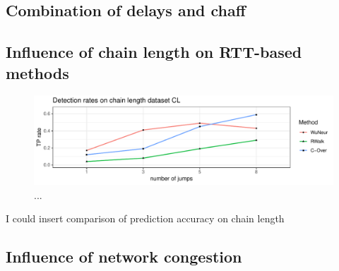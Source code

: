 \documentclass[conference]{IEEEtran}\usepackage[]{graphicx}\usepackage[]{color}
\makeatletter
\def\maxwidth{ %
  \ifdim\Gin@nat@width>\linewidth
    \linewidth
  \else
    \Gin@nat@width
  \fi
}
\newenvironment{knitrout}{}{} %
\makeatother
\begin{document}
\subsection{Combination of delays and chaff}





\subsection{Influence of chain length on RTT-based methods}

\begin{knitrout}
\color{fgcolor}\begin{figure}
\includegraphics[width=\maxwidth]{figure/Influencechainl-1} \caption[..]{...}\label{fig:Influencechainl}
\end{figure}


\end{knitrout}


I could insert comparison of prediction accuracy on chain length


\subsection{Influence of network congestion}







\appendix




 
\end{document}
